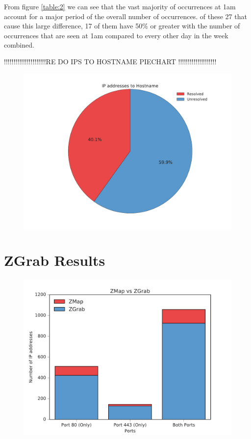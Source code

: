 \documentclass[a4wide,leqno,12pt]{report}
\begin{document}
From figure \ref{table:2} we can see that the vast majority of occurrences at 1am account for a major period of the overall number of occurrences. of these 27 that cause this large difference, 17 of them have 50\% or greater with the number of occurrences that are seen at 1am compared to every other day in the week combined.
 

!!!!!!!!!!!!!!!!!!!!!!RE DO IPS TO HOSTNAME PIECHART !!!!!!!!!!!!!!!!!!!!
\begin{figure}[h!]
\includegraphics[scale=.5]{pdf_images/IpstoHostname}

\end{figure}
\section{ZGrab Results}
\begin{figure}[h!]
\includegraphics[scale=.5]{pdf_images/ZMapVsZGrab}
\end{figure}
\end{document}
